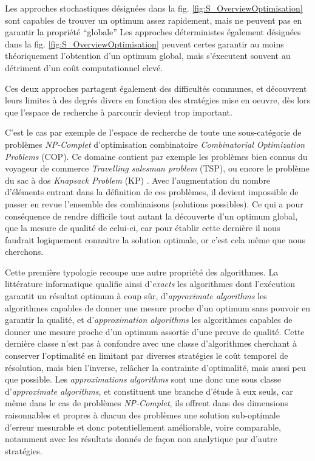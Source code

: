 \begin{itemize}[label=\textbullet]
 Les approches stochastiques désignées dans la fig. \ref{fig:S_OverviewOptimisation} sont capables de trouver un optimum assez rapidement, mais ne peuvent pas en garantir la propriété \enquote{globale}
 Les approches déterministes également désignées dans la fig. \ref{fig:S_OverviewOptimisation} peuvent certes garantir au moins théoriquement l'obtention d'un optimum global, mais s'éxecutent souvent au détriment d'un coût computationnel elevé.
\end{itemize}

Ces deux approches partagent également des difficultés communes, et découvrent leurs limites à des degrés divers en fonction des stratégies mise en oeuvre, dès lors que l'espace de recherche à parcourir devient trop important.

C'est le cas par exemple de l'espace de recherche de toute une sous-catégorie de problèmes \textit{NP-Complet}  d'optimisation combinatoire \textit{Combinatorial Optimization Problems} (COP). Ce domaine contient par exemple les problèmes bien connus du voyageur de commerce \textit{Travelling salesman problem} (TSP), ou encore le problème du sac à dos \textit{Knapsack Problem} (KP) . Avec l'augmentation du nombre d'éléments entrant dans la définition de ces problèmes, il devient impossible de passer en revue l'ensemble des combinaisons (solutions possibles). Ce qui a pour conséquence de rendre difficile tout autant la découverte d'un optimum global, que la mesure de qualité de celui-ci, car pour établir cette dernière il nous faudrait logiquement connaitre la solution optimale, or c'est cela même que nous cherchons.

Cette première typologie recoupe une autre propriété des algorithmes. La littérature informatique qualifie ainsi d'\textit{exacts} les algorithmes dont l'exécution garantit un résultat optimum à coup sûr, d'\textit{approximate algorithms} les algorithmes capables de donner une mesure proche d'un optimum sans pouvoir en garantir la qualité, et d'\textit{approximation algorithms} les algorithmes capables de donner une mesure proche d'un optimum assortie d'une preuve de qualité. Cette dernière classe n'est pas à confondre avec une classe d'algorithmes cherchant à conserver l'optimalité en limitant par diverses stratégies le coût temporel de résolution, mais bien l'inverse, relâcher la contrainte d'optimalité, mais aussi peu que possible. Les \textit{approximations algorithms} sont une donc une sous classe d'\textit{approximate algorithms}, et constituent une branche d'étude à eux seuls, car même dans le cas de problèmes \textit{NP-Complet}, ils offrent dans des dimensions raisonnables et propres à chacun des problèmes une solution sub-optimale d'erreur mesurable et donc potentiellement améliorable, voire comparable, notamment avec les résultats donnés de façon non analytique par d'autre stratégies.

